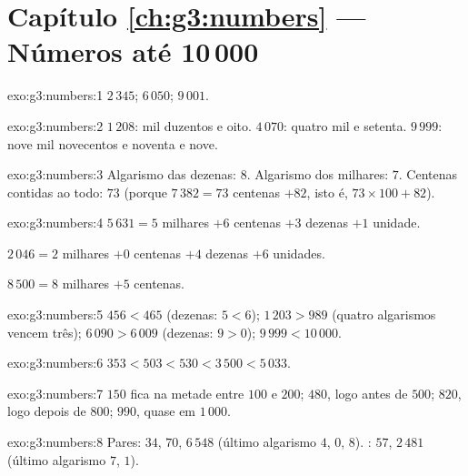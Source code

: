 \section*{Capítulo \ref{ch:g3:numbers} --- Números até 10\,000}

\begin{solution}{exo:g3:numbers:1}
$2\,345$; \quad $6\,050$; \quad $9\,001$.
\end{solution}

\begin{solution}{exo:g3:numbers:2}
$1\,208$: mil duzentos e oito. \quad
$4\,070$: quatro mil e setenta. \quad
$9\,999$: nove mil novecentos e noventa e nove.
\end{solution}

\begin{solution}{exo:g3:numbers:3}
Algarismo das dezenas: $8$. Algarismo dos milhares: $7$. Centenas
contidas ao todo: $73$ (porque $7\,382 = 73$ centenas $+ 82$, isto
é, $73 \times 100 + 82$).
\end{solution}

\begin{solution}{exo:g3:numbers:4}
$5\,631 = 5$ milhares $+ 6$ centenas $+ 3$ dezenas $+ 1$ unidade.

$2\,046 = 2$ milhares $+ 0$ centenas $+ 4$ dezenas $+ 6$ unidades.

$8\,500 = 8$ milhares $+ 5$ centenas.
\end{solution}

\begin{solution}{exo:g3:numbers:5}
$456 < 465$ (dezenas: $5 < 6$); \quad
$1\,203 > 989$ (quatro algarismos vencem três); \quad
$6\,090 > 6\,009$ (dezenas: $9 > 0$); \quad
$9\,999 < 10\,000$.
\end{solution}

\begin{solution}{exo:g3:numbers:6}
$353 < 503 < 530 < 3\,500 < 5\,033$.
\end{solution}

\begin{solution}{exo:g3:numbers:7}
$150$ fica na metade entre $100$ e $200$; $480$, logo antes de
$500$; $820$, logo depois de $800$; $990$, quase em $1\,000$.
\end{solution}

\begin{solution}{exo:g3:numbers:8}
Pares: $34$, $70$, $6\,548$ (último algarismo $4$, $0$, $8$).
: $57$, $2\,481$ (último algarismo $7$, $1$).
\end{solution}

